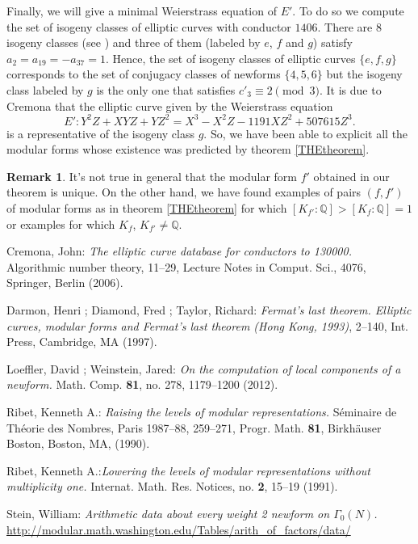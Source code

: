 \documentclass[12pt,reqno]{amsart}
\theoremstyle{plain}
\theoremstyle{definition}
\newtheorem{remark}[theorem]{Remark}
\begin{document}
Finally, we will give a minimal Weierstrass equation of $E'$. To do so we compute the set of isogeny classes of elliptic curves with conductor $1406$. There are $8$ isogeny classes (see \cite{Cremona2006}) and three of them (labeled by $e$, $f$ and $g$) satisfy $a_2=a_{19}=-a_{37}=1$. Hence, the set of isogeny classes of elliptic curves $\{e,f,g\}$ corresponds to the set of conjugacy classes of newforms $\{4,5,6\}$ but the isogeny class labeled by $g$ is the only one that satisfies $c'_3\equiv 2 \pmod 3$. It is due to Cremona that the elliptic curve given by the Weierstrass equation
$$
E': Y^2 Z + XYZ + YZ^2 = X^3- X^2 Z-1191X Z^2 +507615 Z^3.
$$
is a representative of the isogeny class $g$. So, we have been able to explicit all the modular forms whose existence was predicted by theorem \ref{THEtheorem}.
\begin{remark}
It's not true in general that the modular form $f'$ obtained in our theorem is unique. 
On the other hand, we have found examples of pairs $(f,f')$ of modular forms as in theorem \ref{THEtheorem} for which $[K_{f'}:\mathbb Q]>[K_{f}:\mathbb Q]=1$ or examples for which $K_f$, $K_{f'}\neq \mathbb Q$.
\end{remark}

 \begin{thebibliography}{AM} 

  Cremona, John:
 \emph{The elliptic curve database for conductors to 130000.}
 Algorithmic number theory, 
 11--29, Lecture Notes in Comput. Sci., 4076, Springer, Berlin  (2006).  
 
 Darmon, Henri ;  Diamond, Fred ;  Taylor, Richard:
\emph{Fermat's last theorem. Elliptic curves, modular forms and Fermat's last theorem
 (Hong Kong,
 1993)}, 
 2--140, Int. Press, Cambridge, MA  (1997). 

 
  Loeffler, David ;  Weinstein, Jared:
 \emph{On the computation of local components of a newform.}
 Math. Comp.  \textbf{81}, no. 278, 1179--1200  (2012).
              
 Ribet, Kenneth A.:  \emph{Raising the levels of modular representations.}
 Séminaire de Théorie des Nombres, Paris 1987--88, 
 259--271, Progr. Math. \textbf{81}, Birkh\"auser Boston, Boston, MA,  (1990). 

  Ribet, Kenneth A.:\emph{Lowering the levels of modular representations without multiplicity
 one.}
 Internat. Math. Res. Notices,  no. \textbf{2}, 15--19 (1991).

 Stein, William:  \emph{Arithmetic data about every weight 2 newform on $\Gamma_0(N)$.}\\
\href{http://modular.math.washington.edu/Tables/arith_of_factors/data/}{http://modular.math.washington.edu/Tables/arith\_of\_factors/data/}

\end{thebibliography}
\end{document}
